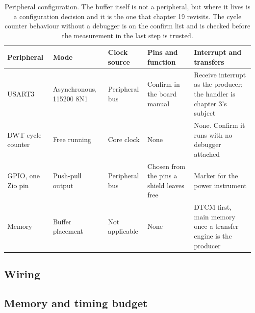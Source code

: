 \begin{table}[H]\centering\small
\begin{tabular}{p{22mm}p{26mm}p{24mm}p{30mm}p{30mm}}
\toprule
Peripheral & Mode & Clock source & Pins and function & Interrupt and transfers \\
\midrule
USART3 & Asynchronous, 115200 8N1 & Peripheral bus & Confirm in the board manual & Receive interrupt as the producer; the handler is chapter 3's subject \\
DWT cycle counter & Free running & Core clock & None & None. Confirm it runs with no debugger attached \\
GPIO, one Zio pin & Push-pull output & Peripheral bus & Chosen from the pins a shield leaves free & Marker for the power instrument \\
Memory & Buffer placement & Not applicable & None & DTCM first, main memory once a transfer engine is the producer \\
\bottomrule
\end{tabular}
\caption{Peripheral configuration. The buffer itself is not a peripheral, but where it lives is a configuration decision and it is the one that chapter 19 revisits. The cycle counter behaviour without a debugger is on the confirm list and is checked before the measurement in the last step is trusted.}
\end{table}

\subsection*{Wiring}


\subsection*{Memory and timing budget}


